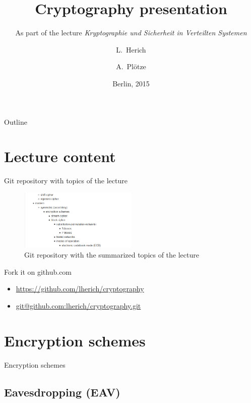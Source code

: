 \documentclass[ucs,9pt]{beamer}
\title{Cryptography presentation}
\subtitle{As part of the lecture \textit{Kryptographie und Sicherheit in Verteilten Systemen}}
\author{L.~Herich \and A.~Plötze}
\institute[FU Berlin]{Freie Universität Berlin}
\date{Berlin, 2015}
\begin{document}
\begin{frame}[plain]
  \titlepage
\end{frame}

\begin{frame}{Outline}
  \tableofcontents
\end{frame}


\section{Lecture content}

\begin{frame}{Git repository with topics of the lecture}
    \begin{figure}[h]
        \centering
        \includegraphics[width=0.5\textwidth]{figures/list_of_content.png}
        \caption{Git repository with the summarized topics of the lecture}
    \end{figure}
    \begin{block}{Fork it on github.com}
        \begin{itemize}
            \item 
            \url{https://github.com/lherich/cryptography}
            \item
            \url{git@github.com:lherich/cryptography.git}
        \end{itemize}
    \end{block}
\end{frame}


%
%
\section{Encryption schemes}
\begin{frame}
    \centering
    \huge{Encryption schemes}
\end{frame}


\subsection{Eavesdropping (EAV)}
\end{document}
